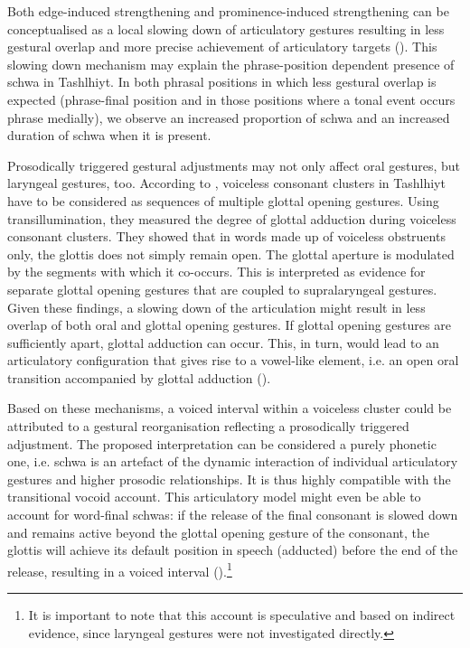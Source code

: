 Both edge-induced strengthening and prominence-induced strengthening can be conceptualised as a local slowing down of articulatory gestures resulting in less gestural overlap and more precise achievement of articulatory targets (\citealt{ByrdSaltzman2003,Saltzman2008}). This slowing down mechanism may explain the phrase-position dependent presence of schwa in Tashlhiyt. In both phrasal positions in which less gestural overlap is expected (phrase-final position and in those positions where a tonal event occurs phrase medially), we observe an increased proportion of schwa and an increased duration of schwa when it is present. 

Prosodically triggered gestural adjustments may not only affect oral gestures, but laryngeal gestures, too. According to \citet{Ridouane2007lar}, voiceless consonant clusters in Tashlhiyt have to be considered as sequences of multiple glottal opening gestures. Using transillumination, they measured the degree of glottal adduction during voiceless consonant clusters. They showed that in words made up of voiceless obstruents only, the glottis does not simply remain open. The glottal aperture is modulated by the segments with which it co-occurs. This is interpreted as evidence for separate glottal opening gestures that are coupled to supralaryngeal gestures. Given these findings, a slowing down of the articulation might result in less overlap of both oral and glottal opening gestures. If glottal opening gestures are sufficiently apart, glottal adduction can occur. This, in turn, would lead to an articulatory configuration that gives rise to a vowel-like element, i.e. an open oral transition accompanied by glottal adduction (\citealt{Goldstein2011,Goldstein2014}). 

Based on these mechanisms, a voiced interval within a voiceless cluster could be attributed to a gestural reorganisation reflecting a prosodically triggered adjustment. The proposed interpretation can be considered a purely phonetic one, i.e. schwa is an artefact of the dynamic interaction of individual articulatory gestures and higher prosodic relationships. It is thus highly compatible with the transitional vocoid account. This articulatory model might even be able to account for word-final schwas: if the release of the final consonant is slowed down and remains active beyond the glottal opening gesture of the consonant, the glottis will achieve its default position in speech (adducted) before the end of the release, resulting in a voiced interval (\citealt{Goldstein2014}).\footnote{It is important to note that this account is speculative and based on indirect evidence, since laryngeal gestures were not investigated directly.} 


